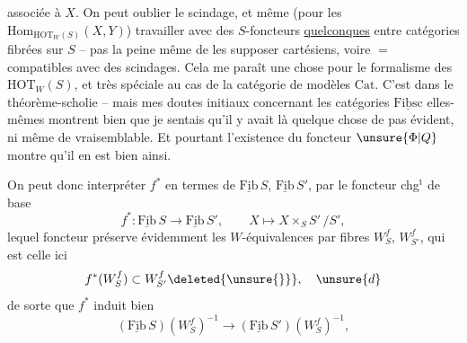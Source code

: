 associée à $X$. On peut oublier le scindage, et même (pour  les $\mathrm{Hom}_{\mathrm{HOT}_W(S)}(X,Y)$) travailler avec des $S$-foncteurs \uline{quelconques} entre catégories fibrées sur $S$ -- pas la peine même de les supposer cartésiens, voire $=$ compatibles avec des scindages. Cela me paraît une chose   pour le formalisme des $\mathrm{HOT}_W(S)$, et très spéciale au cas  de la catégorie de modèles $\mathrm{Cat}$.
C'est   dans le théorème-scholie -- mais mes doutes initiaux concernant les catégories $\underline{\mathrm{Fibsc}}$ elles-mêmes montrent bien que je sentais qu'il y avait là quelque chose de pas évident, ni même  de vraisemblable. Et pourtant l'existence du foncteur $\unsure{\Phi|Q}$ montre qu'il en est bien ainsi.

On peut donc interpréter $f^*$ en termes de $\underline{\mathrm{Fib}}\,S$, $\underline{\mathrm{Fib}}\,S'$, par le foncteur chg$^{\mathrm t}$ de base
\[
f^*:\underline{\mathrm{Fib}}\,S\longrightarrow\underline{\mathrm{Fib}}\,S',\qquad X\longmapsto X\times_S S'\,/S',
\]
lequel foncteur préserve évidemment les $W$-équivalences par fibres $W_S^f$, $W_{S'}^f$, qui est celle  ici
\[
f^*(W_S^f)\subset W_{S'}^f\deleted{\unsure{\}}},\quad\unsure{d}
\]
de sorte que $f^*$ induit bien
\[
(\underline{\mathrm{Fib}}\,S)(W_S^f)^{-1}\longrightarrow(\underline{\mathrm{Fib}}\,S')(W_S^f)^{-1},
\]
